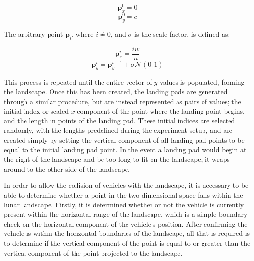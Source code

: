 \documentclass[conference]{IEEEtran}
\begin{document}
\begin{equation} 
\boldsymbol {p}_{x}^{0} = 0
\end{equation}
\begin{equation} 
\boldsymbol {p}_{y}^{0} = c
\end{equation} 

The arbitrary point $\boldsymbol {p}_{i}$, where $i \neq 0$, and $\sigma$ is the scale factor, is defined as:

\begin{equation}
\boldsymbol {p}_{x}^{i} = \frac{iw}{n} 
\end{equation}
\begin{equation}
\boldsymbol {p}_{y}^{i} = \boldsymbol {p}_{y}^{i-1} + \sigma\mathcal{N}(0,1)
\end{equation}

This process is repeated until the entire vector of $y$ values is populated, forming the landscape. Once this has been created, the landing pads are generated through a similar procedure, but are instead represented as pairs of values; the initial index or scaled $x$ component of the point where the landing point begins, and the length in points of the landing pad. These initial indices are selected randomly, with the lengths predefined during the experiment setup, and are created simply by setting the vertical component of all landing pad points to be equal to the initial landing pad point. In the event a landing pad would begin at the right of the landscape and be too long to fit on the landscape, it wraps around to the other side of the landscape.

In order to allow the collision of vehicles with the landscape, it is necessary to be able to determine whether a point in the two dimensional space falls within the lunar landscape. Firstly, it is determined whether or not the vehicle is currently present within the horizontal range of the landscape, which is a simple boundary check on the horizontal component of the vehicle's position. After confirming the vehicle is within the horizontal boundaries of the landscape, all that is required is to determine if the vertical component of the point is equal to or greater than the vertical component of the point projected to the landscape.
\end{document}
